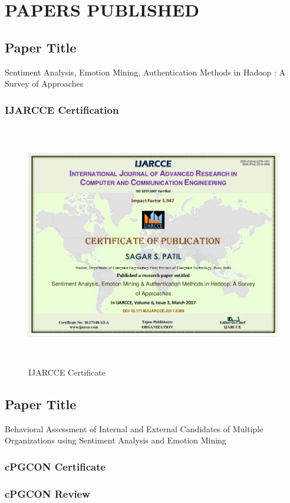 \documentclass[oneside,a4paper,12pt]{pictreport}
\begin{document}
\appendix
\chapter{PAPERS PUBLISHED}
\section{Paper Title}
Sentiment Analysis, Emotion Mining, Authentication Methods in Hadoop :  A Survey of Approaches
\subsection{IJARCCE Certification}
\begin{figure}[!h]
\includegraphics[width=5.5in,height=4.2in]{ijarcce.png}
\caption{IJARCCE Certificate}
\end{figure}
\section{Paper Title}
Behavioral Assessment of Internal and External Candidates of Multiple Organizations using Sentiment Analysis and Emotion Mining
\subsection{cPGCON Certificate}
\subsection{cPGCON Review}
\end{document}
